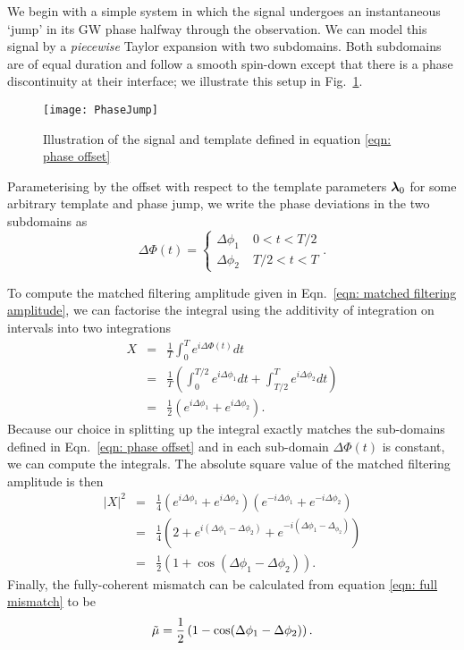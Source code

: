 \documentclass[../full_thesis/full_thesis.tex]{subfiles}
\begin{document}
We begin with a simple system in which the signal undergoes an instantaneous
`jump' in its GW phase halfway through the observation. We can model this
signal by a \emph{piecewise} Taylor expansion with two subdomains.  Both
subdomains are of equal duration and follow a smooth spin-down except that
there is a phase discontinuity at their interface; we illustrate this setup in
Fig.~\ref{fig: PhaseJump}.
\begin{figure}[htb]
    \centering
    \texttt{[image: PhaseJump]}
    \caption{Illustration of the signal and template defined in equation
        \eqref{eqn: phase offset}}
    \label{fig: PhaseJump}
\end{figure}
Parameterising by the offset with respect to the template parameters ${\bm{\lambda}}_{0}$ for some
arbitrary template and phase jump, we write the phase deviations in the two
subdomains as
\begin{equation}
 \Delta\Phi(t) = \left\{
\begin{array}{cr}
\Delta \phi_{1}& \; 0 < t < T/2 \\
\Delta \phi_{2} & \;  T/2 < t < T
\end{array}.
\right.
\label{eqn: phase offset}
\end{equation}

To compute the matched filtering amplitude given in Eqn.~\eqref{eqn: matched
filtering amplitude}, we can factorise the integral using the additivity of
integration on intervals into two integrations
\begin{eqnarray}
X & = &\frac{1}{T } \int_{0}^{T}e^{i\Delta\Phi(t)} dt\\
 & = &\frac{1}{T }\left(\int_{0}^{T /2}e^{i\Delta\phi_{1}} dt  +
\int_{T/2}^{T} e^{i\Delta\phi_{2}}dt\right)\\
& = & \frac{1}{2}\left(e^{i\Delta\phi_{1}} + e^{i\Delta\phi_{2}}\right).
\end{eqnarray}
Because our choice in splitting up the integral exactly matches the sub-domains
defined in Eqn.~\eqref{eqn: phase offset} and in each sub-domain $\Delta\Phi(t)$
is constant, we can compute the integrals.
The absolute square value of the matched filtering amplitude is then
\begin{eqnarray}
|X|^{2}& = &\frac{1}{4}\left(e^{i\Delta\phi_{1}} + e^{i\Delta\phi_{2}}\right) \left(e^{-i\Delta\phi_{1}} + e^{-i\Delta\phi_{2}}\right)\\
& = &\frac{1}{4} \left(2 + e^{i(\Delta\phi_{1} - \Delta \phi_{2})} +  e^{-i(\Delta\phi_{1} - \Delta_{\phi_{2}})} \right) \\
& = &\frac{1}{2}\left(1 + \cos(\Delta\phi_{1} - \Delta\phi_{2})\right).
\end{eqnarray}
Finally, the fully-coherent mismatch can be calculated from equation \eqref{eqn: full mismatch}
to be
\begin{equation}
\tilde{\mu} = \frac{1}{2}\left(1 - \cos(\Delta\phi_{1} - \Delta\phi_{2})\right).
\label{eqn: two segment phase mismatch}
\end{equation}
\end{document}
